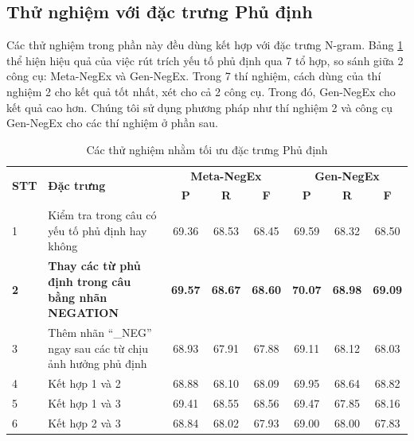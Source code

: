 \subsection*{Thử nghiệm với đặc trưng Phủ định}
Các thử nghiệm trong phần này đều dùng kết hợp với đặc trưng N-gram. Bảng \ref{table:negation} thể hiện hiệu quả của việc rút trích yếu tố phủ định qua 7 tổ hợp, so sánh giữa 2 công cụ: Meta-NegEx và Gen-NegEx. Trong 7 thí nghiệm, cách dùng của thí nghiệm 2 cho kết quả tốt nhất, xét cho cả 2 công cụ. Trong đó, Gen-NegEx cho kết quả cao hơn. Chúng tôi sử dụng phương pháp như thí nghiệm 2 và công cụ Gen-NegEx cho các thí nghiệm ở phần sau.
\begin{table}[H]
\centering
\begin{minipage}{1\textwidth}
\caption{Các thử nghiệm nhằm tối ưu đặc trưng Phủ định} \label{table:negation}
\begin{tabular}{|l|m{}|ccc|ccc|}
\hline
\multirow{2}{*}{\textbf{STT}} & \multirow{2}{*}{\textbf{Đặc trưng}} & \multicolumn{3}{c|}{\textbf{Meta-NegEx}} & \multicolumn{3}{c|}{\textbf{Gen-NegEx}}  \\ \cline{3-8}
                     &                            & \textbf{P}           & \textbf{R}           & \textbf{F}           & \textbf{P}        & \textbf{R}        & \textbf{F}        \\
\hline
1 & Kiểm tra trong câu có yếu tố phủ định hay không& 69.36 & 68.53 & 68.45 &
69.59 & 68.32 & 68.50 \\ \hline

\textbf{2} & \textbf{Thay các từ phủ định trong câu bằng nhãn NEGATION} & \textbf{69.57} & \textbf{68.67} & \textbf{68.60} & 
\textbf{70.07} & \textbf{68.98} & \textbf{69.09} \\ \hline

3 & Thêm nhãn ``\_NEG'' ngay sau các từ chịu ảnh hưởng phủ định & 68.93 & 67.91 & 67.88 &
69.11 & 68.12 & 68.03 \\ \hline

4 & Kết hợp 1 và 2 & 68.88 & 68.10 & 68.09 &
69.95 & 68.64 & 68.82 \\ \hline

5 & Kết hợp 1 và 3 & 69.41 & 68.55  & 68.56 &
69.47 & 67.85 & 68.16 \\ \hline

6 & Kết hợp 2 và 3 & 68.84 & 68.02 & 67.93 &
69.00 & 68.00 & 67.83 \\ \hline


\end{tabular}
\end{minipage}
\end{table}
